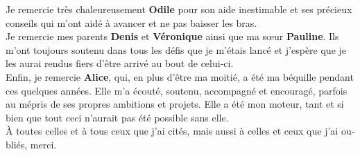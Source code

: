 \begin{otherlanguage}{french}
Je remercie très chaleureusement \textbf{Odile} pour son aide inestimable et ses
précieux conseils qui m'ont aidé à avancer et ne pas baisser les bras.\\

Je remercie mes parents \textbf{Denis} et \textbf{Véronique} ainsi que ma sœur
\mbox{\textbf{Pauline}}. Ils m'ont toujours soutenu dans tous les défis que je m'étais
lancé et j'espère que je les aurai rendus fiers d'être arrivé au bout de
celui-ci.\\

Enfin, je remercie \textbf{Alice}, qui, en plus d'être ma moitié, a été ma
béquille pendant ces quelques années. Elle m'a écouté, soutenu, accompagné et
encouragé, parfois au mépris de ses propres ambitions et projets. Elle a été mon
moteur, tant et si bien que tout ceci n'aurait pas été possible sans elle.\\

À toutes celles et à tous ceux que j'ai cités, mais aussi à celles et ceux que
j'ai oubliés, merci. \\

\end{otherlanguage}